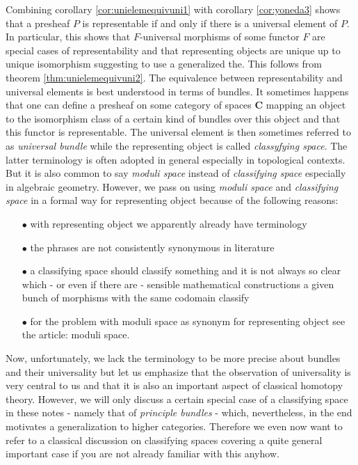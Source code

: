Combining corollary \ref{cor:unielemequivuni1} with corollary \ref{cor:yoneda3} shows that a presheaf $P$ is representable if and only if there is a universal element of $P$. In particular, this shows that $F$-universal morphisms of some functor $F$ are special cases of representability and that representing objects are unique up to unique isomorphism suggesting to use a generalized {\glqq}the{\grqq}. This follows from theorem \ref{thm:unielemequivuni2}. The equivalence between representability and universal elements is best understood in terms of bundles. It sometimes happens that one can define a presheaf on some category of {\glqq}spaces{\grqq} $\mathbf{C}$ mapping an object to the isomorphism class of a certain kind of bundles over this object and that this functor is representable. The universal element is then sometimes referred to as \textit{universal bundle} while the representing object is called \textit{classyfying space}. The latter terminology is often adopted in general especially in topological contexts. But it is also common to say \textit{moduli space} instead of \textit{classifying space} especially in algebraic geometry. However, we pass on using \textit{moduli space} and \textit{classifying space} in a formal way for {\glqq}representing object{\grqq} because of the following reasons:
\begin{enumerate}
\item[$\bullet$]
with {\glqq}representing object{\grqq} we apparently already have terminology
\item[$\bullet$]
the phrases are not consistently synonymous in literature
\item[$\bullet$]
a classifying space should classify something and it is not always so clear which - or even if there are - sensible mathematical constructions a given bunch of morphisms with the same codomain classify
\item[$\bullet$]
for the problem with moduli space as synonym for representing object see the \cite{wiki-nlab0000} article: moduli space.
\end{enumerate}
Now, unfortunately, we lack the terminology to be more precise about bundles and their universality but let us emphasize that the observation of universality is very central to us and that it is also an important aspect of classical homotopy theory. However, we will only discuss a certain special case of a classifying space in these notes - namely that of \textit{principle bundles} - which, nevertheless, in the end motivates a generalization to higher categories. Therefore we even now want to refer to a classical discussion on classifying spaces \cite{4dc38f27} covering a quite general important case if you are not already familiar with this anyhow.
